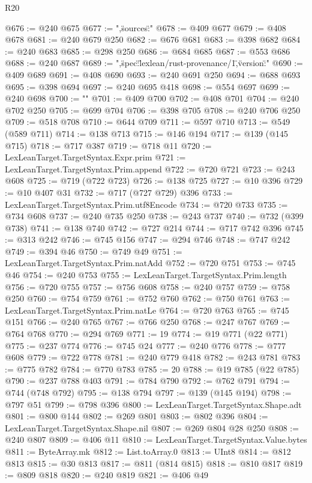 \begin{lexlean}{R20}
\begin{coremodule}
{@676 := @240 @675
@677 := ",\"sources\":"
@678 := @409 @677
@679 := @408 @678
@681 := @240 @679 @250
@682 := @676 @681
@683 := @398 @682
@684 := @240 @683
@685 := @298 @250
@686 := @684 @685
@687 := @553 @686
@688 := @240 @687
@689 := ",\"spec\":\"lexlean/rust-provenance/1\",\"version\":"
@690 := @409 @689
@691 := @408 @690
@693 := @240 @691 @250
@694 := @688 @693
@695 := @398 @694
@697 := @240 @695 @418
@698 := @554 @697
@699 := @240 @698
@700 := "}\n"
@701 := @409 @700
@702 := @408 @701
@704 := @240 @702 @250
@705 := @699 @704
@706 := @398 @705
@708 := @240 @706 @250
@709 := @518 @708
@710 := @644 @709
@711 := @597 @710
@713 := @549 (@589 @711)
@714 := @138 @713
@715 := @146 @194
@717 := @139 (@145 @715)
@718 := @717 @387
@719 := @718 @11
@720 := LexLeanTarget.TargetSyntax.Expr.prim
@721 := LexLeanTarget.TargetSyntax.Prim.append
@722 := @720 @721
@723 := @243 @608
@725 := @719 (@722 @723)
@726 := @138 @725
@727 := @10 @396
@729 := @10 @407 @31
@732 := @717 (@727 @729) @396
@733 := LexLeanTarget.TargetSyntax.Prim.utf8Encode
@734 := @720 @733
@735 := @734 @608
@737 := @240 @735 @250
@738 := @243 @737
@740 := @732 (@399 @738)
@741 := @138 @740
@742 := @727 @214
@744 := @717 @742 @396
@745 := @313 @242
@746 := @745 @156
@747 := @294 @746
@748 := @747 @242
@749 := @394 @46
@750 := @749 @49
@751 := LexLeanTarget.TargetSyntax.Prim.natAdd
@752 := @720 @751
@753 := @745 @46
@754 := @240 @753
@755 := LexLeanTarget.TargetSyntax.Prim.length
@756 := @720 @755
@757 := @756 @608
@758 := @240 @757
@759 := @758 @250
@760 := @754 @759
@761 := @752 @760
@762 := @750 @761
@763 := LexLeanTarget.TargetSyntax.Prim.natLe
@764 := @720 @763
@765 := @745 @151
@766 := @240 @765
@767 := @766 @250
@768 := @247 @767
@769 := @764 @768
@770 := @294 @769
@771 := 19
@774 := @19 @771 (@22 @771)
@775 := @237 @774
@776 := @745 @24
@777 := @240 @776
@778 := @777 @608
@779 := @722 @778
@781 := @240 @779 @418
@782 := @243 @781
@783 := @775 @782
@784 := @770 @783
@785 := 20
@788 := @19 @785 (@22 @785)
@790 := @237 @788 @403
@791 := @784 @790
@792 := @762 @791
@794 := @744 (@748 @792)
@795 := @138 @794
@797 := @139 (@145 @194)
@798 := @797 @51
@799 := @798 @396
@800 := LexLeanTarget.TargetSyntax.Shape.adt
@801 := @800 @144
@802 := @269 @801
@803 := @802 @396
@804 := LexLeanTarget.TargetSyntax.Shape.nil
@807 := @269 @804 @28 @250
@808 := @240 @807
@809 := @406 @11
@810 := LexLeanTarget.TargetSyntax.Value.bytes
@811 := ByteArray.mk
@812 := List.toArray.{0}
@813 := UInt8
@814 := @812 @813
@815 := @30 @813
@817 := @811 (@814 @815)
@818 := @810 @817
@819 := @809 @818
@820 := @240 @819
@821 := @406 @49

\end{coremodule}
\end{lexlean}
